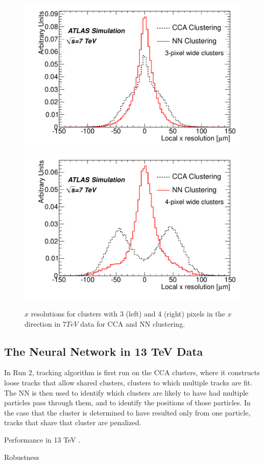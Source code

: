 \begin{centering}
\begin{figure}[bth]
\myfloatalign
\includegraphics[width=.45\linewidth]{figures/nn/3x_res.pdf}
\includegraphics[width=.45\linewidth]{figures/nn/4x_res.pdf}
\caption{$x$ resolutions for clusters with 3 (left) and 4 (right) pixels in the $x$ direction in $7 TeV$ data for \ac{CCA} and \ac{NN} clustering.}
\label{fig:7tev_res}
\end{figure}
\end{centering}

\subsection{The Neural Network in 13 TeV Data}

In Run 2, tracking algorithm is first run on the \ac{CCA} clusters, where it constructs loose tracks that allow shared clusters, clusters to which multiple tracks are fit. The \ac{NN} is then used to identify which clusters are likely to have had multiple particles pass through them, and to identify the positions of those particles. In the case that the cluster is determined to have resulted only from one particle, tracks that share that cluster are penalized. 

Performance in 13 TeV \cite{ATL-PHYS-PUB-2015-044}. 

Robustness \cite{ATL-PHYS-PUB-2015-052}
